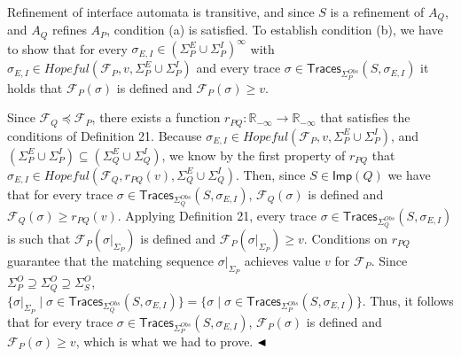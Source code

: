 
 
Refinement of interface automata is transitive, and since $S$ is a refinement of $A_{Q}$, and $A_{Q}$ refines $A_{P}$, condition (a) is satisfied. To establish condition (b), we have to show that for every $\sigma_{E,I}\in(\Sigma_{P}^{E}\cup\Sigma_{P}^{I})^{\infty}$ with $\sigma_{E,I}\in\mathit{Hopeful}(\mathcal{F}_{P},v,\Sigma_{P}^{E}\cup\Sigma_{P}^{I})$ and every trace $\sigma\in\mathsf{Traces}_{\Sigma_{P}^{Obs}}(S,\sigma_{E,I})$ it holds that $\mathcal{F}_{P}(\sigma)$ is defined and $\mathcal{F}_{P}(\sigma)\geq v$.\par
 
 
 
Since $\mathcal{F}_{Q}\preceq\mathcal{F}_{P}$, there exists a function $r_{PQ}:\mathbb{R}_{-\infty}\to\mathbb{R}_{-\infty}$ that satisfies the conditions of Definition 21. Because $\sigma_{E,I}\in\mathit{Hopeful}(\mathcal{F}_{P},v,\Sigma_{P}^{E}\cup\Sigma_{P}^{I})$, and $(\Sigma_{P}^{E}\cup\Sigma_{P}^{I})\subseteq(\Sigma_{Q}^{E}\cup\Sigma_{Q}^{I})$, we know by the first property of $r_{PQ}$ that $\sigma_{E,I}\in\mathit{Hopeful}(\mathcal{F}_{Q},r_{PQ}(v),\Sigma_{Q}^{E}\cup\Sigma_{Q}^{I})$. Then, since $S\in\mathsf{Imp}(Q)$ we have that for every trace $\sigma\in\mathsf{Traces}_{\Sigma_{Q}^{Obs}}(S,\sigma_{E,I})$, $\mathcal{F}_{Q}(\sigma)$ is defined and $\mathcal{F}_{Q}(\sigma)\geq r_{PQ}(v)$. Applying Definition 21, every trace $\sigma\in\mathsf{Traces}_{\Sigma_{Q}^{Obs}}(S,\sigma_{E,I})$ is such that $\mathcal{F}_{P}(\sigma|_{\Sigma_{P}})$ is defined and $\mathcal{F}_{P}(\sigma|_{\Sigma_{P}})\geq v$. Conditions on $r_{PQ}$ guarantee that the matching sequence $\sigma|_{\Sigma_{P}}$ achieves value $v$ for $\mathcal{F}_{P}$. Since $\Sigma_{P}^{O}\supseteq\Sigma_{Q}^{O}\supseteq\Sigma_{S}^{O}$, $\{\sigma|_{\Sigma_{P}}\mid\sigma\in\mathsf{Traces}_{\Sigma_{Q}^{Obs}}(S,\sigma_{E,I})\}=\{\sigma\mid\sigma\in\mathsf{Traces}_{\Sigma_{P}^{Obs}}(S,\sigma_{E,I})\}$. Thus, it follows that for every trace $\sigma\in\mathsf{Traces}_{\Sigma_{P}^{Obs}}(S,\sigma_{E,I})$, $\mathcal{F}_{P}(\sigma)$ is defined and $\mathcal{F}_{P}(\sigma)\geq v$, which is what we had to prove. $\hfill\blacktriangleleft$\par
 
 
 
